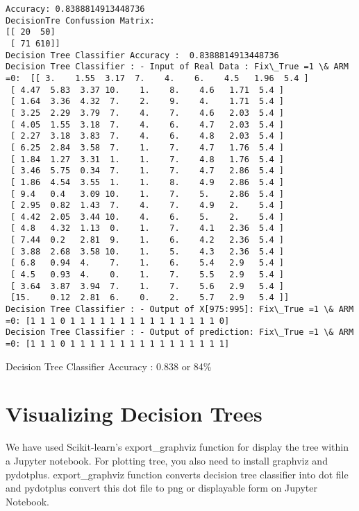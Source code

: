 \documentclass[11pt]{article}
\begin{document}
    \begin{Verbatim}[commandchars=\\\{\}]
Accuracy: 0.8388814913448736
DecisionTre Confussion Matrix: 
[[ 20  50]
 [ 71 610]]
Decision Tree Classifier Accuracy :  0.8388814913448736
Decision Tree Classifier : - Input of Real Data : Fix\_True =1 \& ARM =0:  [[ 3.    1.55  3.17  7.    4.    6.    4.5   1.96  5.4 ]
 [ 4.47  5.83  3.37 10.    1.    8.    4.6   1.71  5.4 ]
 [ 1.64  3.36  4.32  7.    2.    9.    4.    1.71  5.4 ]
 [ 3.25  2.29  3.79  7.    4.    7.    4.6   2.03  5.4 ]
 [ 4.05  1.55  3.18  7.    4.    6.    4.7   2.03  5.4 ]
 [ 2.27  3.18  3.83  7.    4.    6.    4.8   2.03  5.4 ]
 [ 6.25  2.84  3.58  7.    1.    7.    4.7   1.76  5.4 ]
 [ 1.84  1.27  3.31  1.    1.    7.    4.8   1.76  5.4 ]
 [ 3.46  5.75  0.34  7.    1.    7.    4.7   2.86  5.4 ]
 [ 1.86  4.54  3.55  1.    1.    8.    4.9   2.86  5.4 ]
 [ 9.4   0.4   3.09 10.    1.    7.    5.    2.86  5.4 ]
 [ 2.95  0.82  1.43  7.    4.    7.    4.9   2.    5.4 ]
 [ 4.42  2.05  3.44 10.    4.    6.    5.    2.    5.4 ]
 [ 4.8   4.32  1.13  0.    1.    7.    4.1   2.36  5.4 ]
 [ 7.44  0.2   2.81  9.    1.    6.    4.2   2.36  5.4 ]
 [ 3.88  2.68  3.58 10.    1.    5.    4.3   2.36  5.4 ]
 [ 6.8   0.94  4.    7.    1.    6.    5.4   2.9   5.4 ]
 [ 4.5   0.93  4.    0.    1.    7.    5.5   2.9   5.4 ]
 [ 3.64  3.87  3.94  7.    1.    7.    5.6   2.9   5.4 ]
 [15.    0.12  2.81  6.    0.    2.    5.7   2.9   5.4 ]]
Decision Tree Classifier : - Output of X[975:995]: Fix\_True =1 \& ARM =0: [1 1 1 0 1 1 1 1 1 1 1 1 1 1 1 1 1 1 1 0]
Decision Tree Classifier : - Output of prediction: Fix\_True =1 \& ARM =0: [1 1 1 0 1 1 1 1 1 1 1 1 1 1 1 1 1 1 1 1]

    \end{Verbatim}

    Decision Tree Classifier Accuracy : 0.838 or 84\%

    \section{Visualizing Decision Trees}\label{visualizing-decision-trees}

We have used Scikit-learn's export\_graphviz function for display the
tree within a Jupyter notebook. For plotting tree, you also need to
install graphviz and pydotplus. export\_graphviz function converts
decision tree classifier into dot file and pydotplus convert this dot
file to png or displayable form on Jupyter Notebook.
\end{document}
